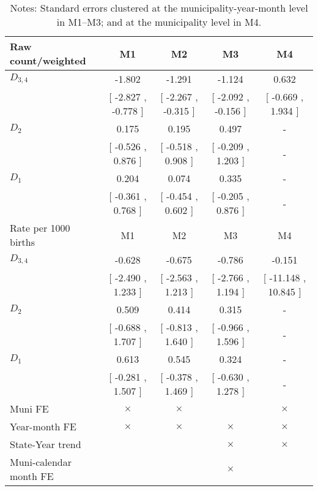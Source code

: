 \begin{table}[!ht]
\centering
\caption{Effects of Drought on lbw}\label{tab:twfe_lbw}
\fontsize{10pt}{12pt}\selectfont
\begin{tabular}{lcccc}
\toprule
  Raw count/weighted &\multicolumn{1}{c}{M1}&\multicolumn{1}{c}{M2}&\multicolumn{1}{c}{M3}&\multicolumn{1}{c}{M4} \\
\midrule
 $ D_{3,4} $ &    -1.802 &    -1.291 &    -1.124 &     0.632 \\ 
 & [    -2.827 ,    -0.778 ] & [    -2.267 ,    -0.315 ] & [    -2.092 ,    -0.156 ] & [    -0.669 ,     1.934 ] \\ 
\addlinespace
 $ D_2 $ &     0.175 &     0.195 &     0.497 & - \\ 
 & [    -0.526 ,     0.876 ] & [    -0.518 ,     0.908 ] & [    -0.209 ,     1.203 ] & - \\ 
\addlinespace
 $ D_1 $ &     0.204 &     0.074 &     0.335 & - \\ 
 & [    -0.361 ,     0.768 ] & [    -0.454 ,     0.602 ] & [    -0.205 ,     0.876 ] & - \\ 
\addlinespace
\midrule
  Rate per 1000 births &\multicolumn{1}{c}{M1}&\multicolumn{1}{c}{M2}&\multicolumn{1}{c}{M3}&\multicolumn{1}{c}{M4} \\
\midrule
 $ D_{3,4} $ &    -0.628 &    -0.675 &    -0.786 &    -0.151 \\ 
 & [    -2.490 ,     1.233 ] & [    -2.563 ,     1.213 ] & [    -2.766 ,     1.194 ] & [   -11.148 ,    10.845 ] \\ 
\addlinespace
 $ D_2 $ &     0.509 &     0.414 &     0.315 & - \\ 
 & [    -0.688 ,     1.707 ] & [    -0.813 ,     1.640 ] & [    -0.966 ,     1.596 ] & - \\ 
\addlinespace
 $ D_1 $ &     0.613 &     0.545 &     0.324 & - \\ 
 & [    -0.281 ,     1.507 ] & [    -0.378 ,     1.469 ] & [    -0.630 ,     1.278 ] & - \\ 
\midrule
  Muni FE & $ \times $ & $ \times $ &  & $ \times $  \\
  Year-month FE & $ \times $ & $ \times $ & $ \times $ & $ \times $ \\
  State-Year trend &  &  & $ \times $ & $ \times $ \\
  Muni-calendar month FE &  &  & $ \times $ & \\
\bottomrule
\end{tabular}
\caption*{\footnotesize{Notes: Standard errors clustered at the municipality-year-month level in M1--M3; and at the municipality level in M4.}}
\end{table}
